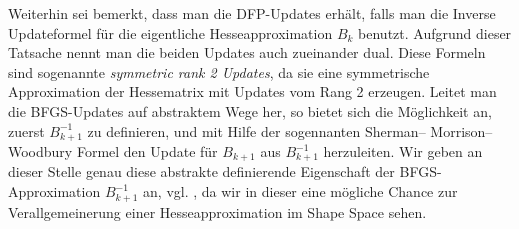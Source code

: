 Weiterhin sei bemerkt, dass man die DFP-Updates erhält, falls man die Inverse Updateformel für die eigentliche Hesseapproximation $B_k$ benutzt. Aufgrund dieser Tatsache nennt man die beiden Updates auch zueinander dual.
Diese Formeln sind sogenannte \textit{symmetric rank 2 Updates}, da sie eine symmetrische Approximation der Hessematrix mit Updates vom Rang 2 erzeugen. Leitet man die BFGS-Updates auf abstraktem Wege her, so bietet sich die Möglichkeit an, zuerst $B_{k+1}^{-1}$ zu definieren, und mit Hilfe der sogennanten Sherman–
Morrison–Woodbury Formel den Update für $B_{k+1}$ aus $B_{k+1}^{-1}$ herzuleiten. Wir geben an dieser Stelle genau diese abstrakte definierende Eigenschaft der BFGS-Approximation $B_{k+1}^{-1}$ an, vgl. \cite{Nocedal}, da wir in dieser eine mögliche Chance zur Verallgemeinerung einer Hesseapproximation im Shape Space sehen.

